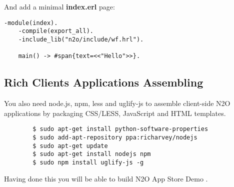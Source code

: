And add a minimal {\bf index.erl} page:

\begin{lstlisting}[caption=index.erl]
    -module(index).
    -compile(export_all).
    -include_lib("n2o/include/wf.hrl").

    main() -> #span{text=<<"Hello">>}.
\end{lstlisting}

\subsection{Rich Clients Applications Assembling}
You also need node.js, npm, less and uglify-js to assemble
client-side N2O applications by packaging CSS/LESS, JavaScript and HTML templates.

\vspace{1\baselineskip}
\begin{lstlisting}
        $ sudo apt-get install python-software-properties
        $ sudo add-apt-repository ppa:richarvey/nodejs
        $ sudo apt-get update
        $ sudo apt-get install nodejs npm
        $ sudo npm install uglify-js -g
\end{lstlisting}
\vspace{1\baselineskip}

Having done this you will be able to build N2O App Store
Demo \newline{}.
